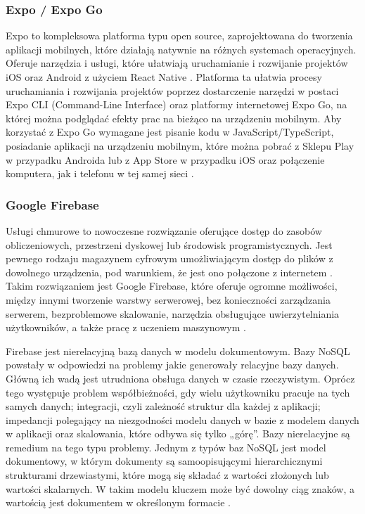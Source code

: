 \subsubsection*{\textbf{Expo / Expo Go}}
\phantom{Th}
Expo to kompleksowa platforma typu open source, zaprojektowana do tworzenia aplikacji mobilnych, które działają natywnie na różnych systemach operacyjnych. Oferuje narzędzia i usługi, które ułatwiają uruchamianie i rozwijanie projektów iOS oraz Android z użyciem React Native \cite{javascripteverywhere}. Platforma ta ułatwia procesy uruchamiania i rozwijania projektów poprzez dostarczenie narzędzi w postaci Expo CLI (Command-Line Interface) oraz platformy internetowej Expo Go, na której można podglądać efekty prac na bieżąco na urządzeniu mobilnym. Aby korzystać z Expo Go wymagane jest pisanie kodu w JavaScript/TypeScript, posiadanie aplikacji na urządzeniu mobilnym, które można pobrać z Sklepu Play w przypadku Androida lub z App Store w przypadku iOS oraz połączenie komputera, jak i telefonu w tej samej sieci \cite{expogo}.

\subsubsection*{\textbf{Google Firebase}}
\phantom{th}
Usługi chmurowe to nowoczesne rozwiązanie oferujące dostęp do zasobów obliczeniowych, przestrzeni dyskowej lub środowisk programistycznych. Jest pewnego rodzaju magazynem cyfrowym umożliwiającym dostęp do plików z dowolnego urządzenia, pod warunkiem, że jest ono połączone z internetem \cite{cloud}. Takim rozwiązaniem jest Google Firebase, które oferuje ogromne możliwości, między innymi tworzenie warstwy serwerowej, bez konieczności zarządzania serwerem, bezproblemowe skalowanie, narzędzia obsługujące uwierzytelniania użytkowników, a także pracę z uczeniem maszynowym \cite{firebase}.

Firebase jest nierelacyjną bazą danych w modelu dokumentowym. Bazy NoSQL powstały w odpowiedzi na problemy jakie generowały relacyjne bazy danych. Główną ich wadą jest utrudniona obsługa danych w czasie rzeczywistym. Oprócz tego występuje problem współbieżności, gdy wielu użytkowniku pracuje na tych samych danych; integracji, czyli zależność struktur dla każdej z aplikacji; impedancji polegający na niezgodności modelu danych w bazie z modelem danych w aplikacji oraz skalowania, które odbywa się tylko „górę”. Bazy nierelacyjne są remedium na tego typu problemy. Jednym z typów baz NoSQL jest model dokumentowy, w którym dokumenty są samoopisującymi hierarchicznymi strukturami drzewiastymi, które mogą się składać z wartości złożonych lub wartości skalarnych. W takim modelu kluczem może być dowolny ciąg znaków, a wartością jest dokumentem w określonym formacie \cite{nosql}.

